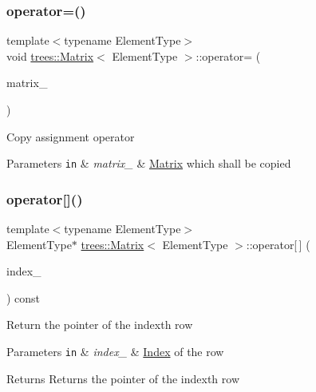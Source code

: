 \subsubsection{\texorpdfstring{operator=()}{operator=()}}
{\footnotesize\ttfamily template$<$typename Element\+Type$>$ \\
void \hyperlink{classtrees_1_1_matrix}{trees\+::\+Matrix}$<$ Element\+Type $>$\+::operator= (\begin{DoxyParamCaption}\item[{const \hyperlink{classtrees_1_1_matrix}{Matrix}$<$ Element\+Type $>$ \&}]{matrix\+\_\+ }\end{DoxyParamCaption})\hspace{0.3cm}{\ttfamily [inline]}}

Copy assignment operator


\begin{DoxyParams}[1]{Parameters}
\mbox{\tt in}  & {\em matrix\+\_\+} & \hyperlink{classtrees_1_1_matrix}{Matrix} which shall be copied \\
\hline
\end{DoxyParams}
\mbox{\label{classtrees_1_1_matrix_a8ef252012ddf2ca4ebfd096ff0a1122b}} 
\subsubsection{\texorpdfstring{operator[]()}{operator[]()}}
{\footnotesize\ttfamily template$<$typename Element\+Type$>$ \\
Element\+Type$\ast$ \hyperlink{classtrees_1_1_matrix}{trees\+::\+Matrix}$<$ Element\+Type $>$\+::operator\mbox{[}$\,$\mbox{]} (\begin{DoxyParamCaption}\item[{size\+\_\+t}]{index\+\_\+ }\end{DoxyParamCaption}) const\hspace{0.3cm}{\ttfamily [inline]}}

Return the pointer of the indexth row


\begin{DoxyParams}[1]{Parameters}
\mbox{\tt in}  & {\em index\+\_\+} & \hyperlink{classtrees_1_1_index}{Index} of the row \\
\hline
\end{DoxyParams}
\begin{DoxyReturn}{Returns}
Returns the pointer of the indexth row 
\end{DoxyReturn}


